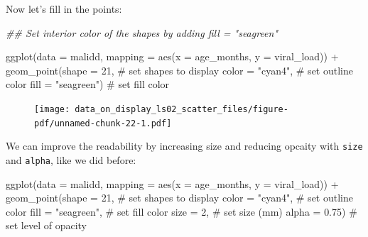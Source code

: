 \documentclass[
  letterpaper,
  DIV=11,
  numbers=noendperiod]{scrreprt}
\newenvironment{Shaded}{\begin{snugshade}}{\end{snugshade}}
\newcommand{\AttributeTok}[1]{\textcolor[rgb]{0.40,0.45,0.13}{#1}}
\newcommand{\CommentTok}[1]{\textcolor[rgb]{0.37,0.37,0.37}{#1}}
\newcommand{\DecValTok}[1]{\textcolor[rgb]{0.68,0.00,0.00}{#1}}
\newcommand{\DocumentationTok}[1]{\textcolor[rgb]{0.37,0.37,0.37}{\textit{#1}}}
\newcommand{\FloatTok}[1]{\textcolor[rgb]{0.68,0.00,0.00}{#1}}
\newcommand{\FunctionTok}[1]{\textcolor[rgb]{0.28,0.35,0.67}{#1}}
\newcommand{\NormalTok}[1]{\textcolor[rgb]{0.00,0.23,0.31}{#1}}
\newcommand{\SpecialCharTok}[1]{\textcolor[rgb]{0.37,0.37,0.37}{#1}}
\newcommand{\StringTok}[1]{\textcolor[rgb]{0.13,0.47,0.30}{#1}}
\begin{document}
Now let's fill in the points:

\begin{Shaded}
\begin{Highlighting}[]
\DocumentationTok{\#\# Set interior color of the shapes by adding \textasciigrave{}fill = "seagreen"\textasciigrave{} }

\FunctionTok{ggplot}\NormalTok{(}\AttributeTok{data =}\NormalTok{ malidd, }
       \AttributeTok{mapping =} \FunctionTok{aes}\NormalTok{(}\AttributeTok{x =}\NormalTok{ age\_months, }
                     \AttributeTok{y =}\NormalTok{ viral\_load)) }\SpecialCharTok{+} 
  \FunctionTok{geom\_point}\NormalTok{(}\AttributeTok{shape =} \DecValTok{21}\NormalTok{,                }\CommentTok{\# set shapes to display}
             \AttributeTok{color =} \StringTok{"cyan4"}\NormalTok{,           }\CommentTok{\# set outline color}
             \AttributeTok{fill =} \StringTok{"seagreen"}\NormalTok{)         }\CommentTok{\# set fill color}
\end{Highlighting}
\end{Shaded}

\begin{figure}[H]

{\centering \texttt{[image: data\_on\_display\_ls02\_scatter\_files/figure-pdf/unnamed-chunk-22-1.pdf]}

}

\end{figure}

We can improve the readability by increasing size and reducing opcaity
with \texttt{size} and \texttt{alpha}, like we did before:

\begin{Shaded}
\begin{Highlighting}[]
\FunctionTok{ggplot}\NormalTok{(}\AttributeTok{data =}\NormalTok{ malidd, }
       \AttributeTok{mapping =} \FunctionTok{aes}\NormalTok{(}\AttributeTok{x =}\NormalTok{ age\_months, }
                     \AttributeTok{y =}\NormalTok{ viral\_load)) }\SpecialCharTok{+} 
  \FunctionTok{geom\_point}\NormalTok{(}\AttributeTok{shape =} \DecValTok{21}\NormalTok{,                }\CommentTok{\# set shapes to display}
             \AttributeTok{color =} \StringTok{"cyan4"}\NormalTok{,           }\CommentTok{\# set outline color}
             \AttributeTok{fill =} \StringTok{"seagreen"}\NormalTok{,         }\CommentTok{\# set fill color}
             \AttributeTok{size =} \DecValTok{2}\NormalTok{,                  }\CommentTok{\# set size (mm)}
             \AttributeTok{alpha =} \FloatTok{0.75}\NormalTok{)              }\CommentTok{\# set level of opacity}
\end{Highlighting}
\end{Shaded}
\end{document}
